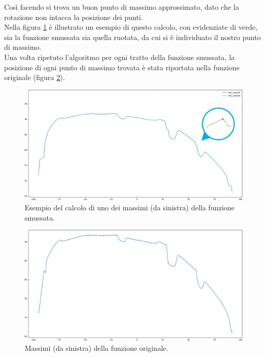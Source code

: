 \noindent Così facendo si trova un buon punto di massimo approssimato, dato che la rotazione non intacca la posizione dei punti.\\
\newline
Nella figura \ref{fig:batt_2_analisi_8} è illustrato un esempio di questo calcolo, con evidenziate di verde, sia la funzione smussata sia quella ruotata, da cui si è individuato il nostro punto di massimo.\\
\newline
Una volta ripetuto l'algoritmo per ogni tratto della funzione smussata, la posizione di ogni punto di massimo trovata è stata riportata nella funzione originale (figura \ref{fig:batt_2_analisi_9}).\\

\begin{figure}[H]
	\centering
	\includegraphics[width=0.9\columnwidth]{./pictures/batt_2_analisi_8.png}
	\caption{Esempio del calcolo di uno dei massimi (da sinistra) della funzione smussata.}\label{fig:batt_2_analisi_8}
\end{figure}

\begin{figure}[H]
	\centering
	\includegraphics[width=0.9\columnwidth]{./pictures/batt_2_analisi_9.png}
	\caption{Massimi (da sinistra) della funzione originale.}\label{fig:batt_2_analisi_9}
\end{figure}

